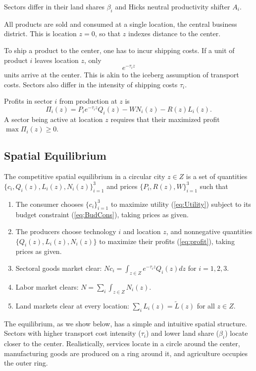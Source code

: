 \documentclass[12pt]{article}
\begin{document}
Sectors differ in their land shares $\beta_i$ and Hicks neutral productivity shifter $A_i$.

All products are sold and consumed at a single location, the central business district. This is location $z=0$, so that $z$ indexes distance to the center.

To ship a product to the center, one has to incur shipping costs. If a unit of product $i$ leaves location $z$, only
\[
e^{-\tau_i z}
\]
units arrive at the center. This is akin to the iceberg assumption of transport costs. Sectors also differ in the intensity of shipping costs $\tau_i$.

Profits in sector $i$ from production at $z$ is
\begin{equation}
\label{eq:profit}
\Pi_i(z)=P_ie^{-\tau_iz}Q_i(z)-WN_i(z)-R(z)L_i(z).
\end{equation}
A sector being active at location $z$ requires that their maximized profit $\max\Pi_i(z)\geq0.$

\subsection{Spatial Equilibrium}
The competitive spatial equilibrium in a circular city $z\in Z$ is a set of quantities $\{c_i, Q_i(z), L_i(z), N_i(z)\}_{i=1}^3$ and prices $\{P_i, R(z), W\}_{i=1}^3$ such that
\begin{enumerate}
    \item The consumer chooses $\{c_i\}_{i=1}^3$ to maximize utility (\ref{eq:Utility}) subject to its budget constraint (\ref{eq:BudCons}), taking prices as given.
    \item The producers choose technology $i$ and location $z$, and nonnegative quantities $\{Q_i(z), L_i(z), N_i(z)\}$ to maximize their profits (\ref{eq:profit}), taking prices as given.
    \item Sectoral goods market clear: $Nc_i=\int_{z\in Z} e^{-\tau_iz}Q_i(z)dz$ for $i=1,2,3$.
    \item Labor market clears: $N=\sum_i\int_{z\in Z} N_i(z)$.
    \item Land markets clear at every location: $\sum_iL_i(z)=\tilde L(z)$ for all $z\in Z$.
\end{enumerate}

The equilibrium, as we show below, has a simple and intuitive spatial structure. Sectors with higher transport cost intensity ($\tau_i$) and lower land share ($\beta_i$) locate closer to the center. Realistically, services locate in a circle around the center, manufacturing goods are produced on a ring around it, and agriculture occupies the outer ring.
\end{document}
